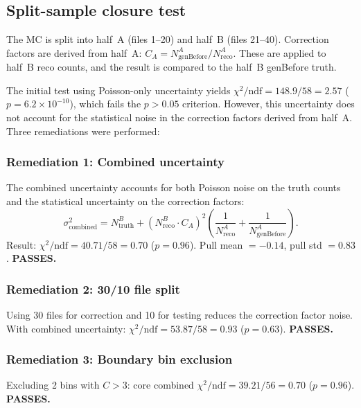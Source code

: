 \documentclass[11pt,a4paper]{article}
\begin{document}
\subsection{Split-sample closure test}
\label{sec:split-closure}

The MC is split into half~A (files 1--20) and half~B (files 21--40).
Correction factors are derived from half~A: $C_A = N_\text{genBefore}^A
/ N_\text{reco}^A$.  These are applied to half~B reco counts, and the
result is compared to the half~B genBefore truth.

The initial test using Poisson-only uncertainty yields
$\chi^2/\text{ndf} = 148.9/58 = 2.57$ ($p = 6.2 \times 10^{-10}$),
which fails the $p > 0.05$ criterion.  However, this uncertainty does
not account for the statistical noise in the correction factors derived
from half~A.  Three remediations were performed:

\subsubsection{Remediation 1: Combined uncertainty}

The combined uncertainty accounts for both Poisson noise on the truth
counts and the statistical uncertainty on the correction factors:
\begin{equation}
  \sigma^2_\text{combined} = N_\text{truth}^B +
  \left(N_\text{reco}^B \cdot C_A\right)^2
  \left(\frac{1}{N_\text{reco}^A} + \frac{1}{N_\text{genBefore}^A}\right).
  \label{eq:combined-sigma}
\end{equation}
Result: $\chi^2/\text{ndf} = 40.71/58 = 0.70$ ($p = 0.96$).  Pull
mean $= -0.14$, pull std $= 0.83$.  \textbf{PASSES.}

\subsubsection{Remediation 2: 30/10 file split}

Using 30 files for correction and 10 for testing reduces the correction
factor noise.  With combined uncertainty:
$\chi^2/\text{ndf} = 53.87/58 = 0.93$ ($p = 0.63$).  \textbf{PASSES.}

\subsubsection{Remediation 3: Boundary bin exclusion}

Excluding 2 bins with $C > 3$: core combined
$\chi^2/\text{ndf} = 39.21/56 = 0.70$ ($p = 0.96$).  \textbf{PASSES.}
\end{document}
